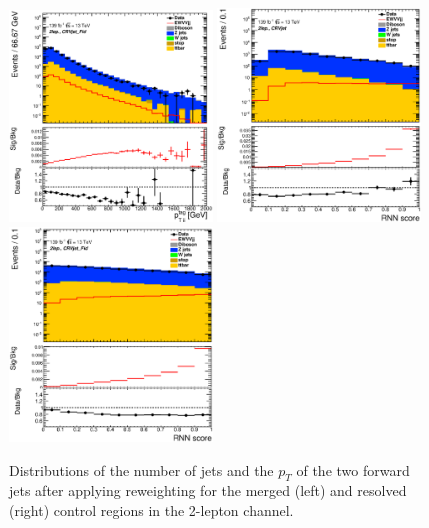 \begin{figure}[ht]
    \includegraphics[width=0.48\textwidth]{figures/2lep/reweighting/after_reweighting/C_0ptag2pjet_0ptv_CRVjet_Fid_PtTagResJets_Log.eps}
    \includegraphics[width=0.48\textwidth]{figures/2lep/reweighting/after_reweighting/C_0ptag1pfat0pjet_0ptv_CRVjet_RNNScoreMerged_Log.eps}
    \includegraphics[width=0.48\textwidth]{figures/2lep/reweighting/after_reweighting/C_0ptag2pjet_0ptv_CRVjet_Fid_RNNScoreResolved_Log.eps}
    \caption{ Distributions of the number of jets and the $p_T$ of the two forward jets after applying reweighting for the merged (left) and resolved (right) control regions in the 2-lepton channel.}
    \label{fig:after_rw}
\end{figure}
